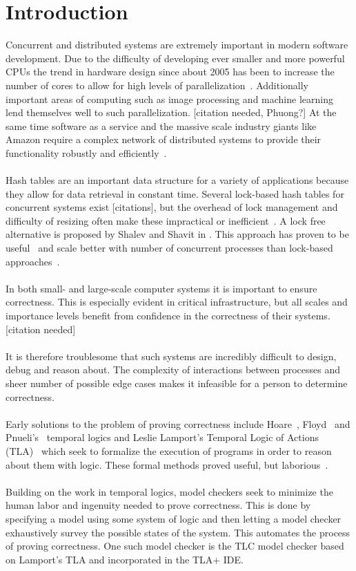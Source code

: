 \documentclass{uit-thesis}
\begin{document}
\mainmatter

\chapter{Introduction}
Concurrent and distributed systems are extremely important in modern software development. Due to the difficulty of developing ever smaller and more powerful CPUs the trend in hardware design since about 2005 has been to increase the number of cores to allow for high levels of parallelization~\cite{Tanenbaum2014}. Additionally important areas of computing such as image processing and machine learning lend themselves well to such parallelization. [citation needed, Phuong?] At the same time software as a service and the massive scale industry giants like Amazon require a complex network of distributed systems to provide their functionality robustly and efficiently~\cite{Amazon2015}.
\\\\
Hash tables are an important data structure for a variety of applications because they allow for data retrieval in constant time. Several lock-based hash tables for concurrent systems exist [citations], but the overhead of lock management and difficulty of resizing often make these impractical or inefficient~\cite{Shalev2006}. A lock free alternative is proposed by Shalev and Shavit in \cite{Shalev2006}. This approach has proven to be useful~\cite{lock-free-structures2013} and scale better with number of concurrent processes than lock-based approaches~\cite{Duarte-Haskell2016}.
\\\\
In both small- and large-scale computer systems it is important to ensure correctness. This is especially evident in critical infrastructure, but all scales and importance levels benefit from confidence in the correctness of their systems. [citation needed]
\\\\
It is therefore troublesome that such systems are incredibly difficult to design, debug and reason about. The complexity of interactions between processes and sheer number of possible edge cases makes it infeasible for a person to determine correctness.
\\\\
Early solutions to the problem of proving correctness include Hoare~\cite{Hoare1969}, Floyd~\cite{Floyd1967} and Pnueli's~\cite{Pnueli1977} temporal logics and Leslie Lamport's Temporal Logic of Actions (TLA)~\cite{Lamport1977} which seek to formalize the execution of programs in order to reason about them with logic. These formal methods proved useful, but laborious~\cite{Clarke2009}.
\\\\
Building on the work in temporal logics, model checkers seek to minimize the human labor and ingenuity needed to prove correctness. This is done by specifying a model using some system of logic and then letting a model checker exhaustively survey the possible states of the system. This automates the process of proving correctness. One such model checker is the TLC model checker based on Lamport's TLA and incorporated in the TLA+ IDE.
\end{document}
